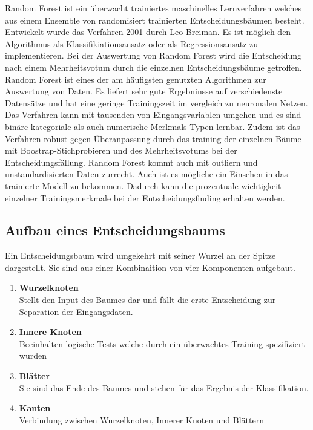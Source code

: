 Random Forest ist ein {\"u}berwacht trainiertes maschinelles Lernverfahren welches aus einem Ensemble von randomisiert trainierten Entscheidungsb{\"a}umen besteht. Entwickelt wurde das Verfahren 2001 durch Leo Breiman. Es ist m{\"o}glich den Algorithmus als Klassifikiationsansatz oder als Regressionsansatz zu implementieren. Bei der Auswertung von Random Forest wird die Entscheidung nach einem Mehrheitsvotum durch die einzelnen Entscheidungsb{\"a}ume getroffen.
Random Forest ist eines der am h{\"a}ufigsten genutzten Algorithmen zur Auswertung von Daten. Es liefert sehr gute Ergebninsse auf verschiedenste Datens{\"a}tze und hat eine geringe Trainingszeit im vergleich zu neuronalen Netzen. Das Verfahren kann mit tausenden von Eingangsvariablen umgehen und es sind bin{\"a}re kategoriale als auch numerische Merkmals-Typen lernbar.
Zudem ist das Verfahren robust gegen {\"U}beranpassung durch das training der einzelnen B{\"a}ume mit Boostrap-Stichprobieren und des Mehrheitsvotums bei der Entscheidungsf{\"a}llung. 
Random Forest kommt auch mit outliern und unstandardisierten Daten zurrecht.
Auch ist es m{\"o}gliche ein Einsehen in das trainierte Modell zu bekommen. Dadurch kann die prozentuale wichtigkeit einzelner Trainingsmerkmale bei der Entscheidungsfinding erhalten werden.

\subsection{Aufbau eines Entscheidungsbaums}
\label{subsec:Aufbau eines Entscheidungsbaums}

Ein Entscheidungsbaum wird umgekehrt mit seiner Wurzel an der Spitze dargestellt.
Sie sind aus einer Kombinaition von vier Komponenten aufgebaut.


\begin{enumerate}

\item[] \textbf{Wurzelknoten}\hfill \\
Stellt den Input des Baumes dar und f{\"a}llt die erste Entscheidung zur Separation der Eingangsdaten.

\item[] \textbf{Innere Knoten}\hfill \\
Beeinhalten logische Tests welche durch ein {\"u}berwachtes Training spezifiziert wurden


\item[] \textbf{Bl{\"a}tter}\hfill \\
Sie sind das Ende des Baumes und stehen f{\"u}r das Ergebnis der Klassifikation.

\item[] \textbf{Kanten}\hfill \\
Verbindung zwischen Wurzelknoten, Innerer Knoten und Bl{\"a}ttern
\end{enumerate}


